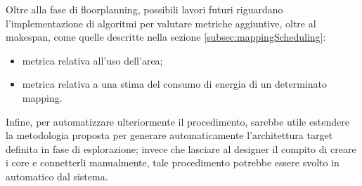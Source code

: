 Oltre alla fase di floorplanning, possibili lavori futuri riguardano l'implementazione di
algoritmi per valutare metriche aggiuntive, oltre al makespan, come quelle descritte
nella sezione \ref{subsec:mappingScheduling}:
\begin{itemize}
 \item metrica relativa all'uso dell'area;
 \item metrica relativa a una stima del consumo di energia di un determinato mapping.
\end{itemize}


Infine, per automatizzare ulteriormente il procedimento, sarebbe utile estendere la metodologia
proposta per generare automaticamente l'architettura target definita in fase di esplorazione; invece
che lasciare al designer il compito di creare i core e connetterli manualmente, tale procedimento
potrebbe essere svolto in automatico dal sistema.